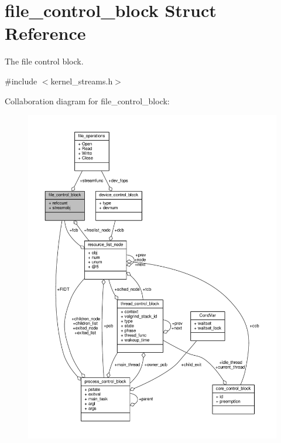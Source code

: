 \hypertarget{structfile__control__block}{}\section{file\+\_\+control\+\_\+block Struct Reference}
\label{structfile__control__block}


The file control block.  




{\ttfamily \#include $<$kernel\+\_\+streams.\+h$>$}



Collaboration diagram for file\+\_\+control\+\_\+block\+:
\nopagebreak
\begin{figure}[H]
\begin{center}
\leavevmode
\includegraphics[width=350pt]{structfile__control__block__coll__graph}
\end{center}
\end{figure}
